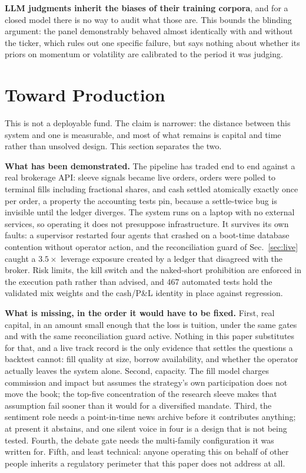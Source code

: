 \documentclass[10pt,twocolumn]{IEEEtran}
\begin{document}
\textbf{LLM judgments inherit the biases of their training corpora}, and for a
closed model there is no way to audit what those are. This bounds the blinding
argument: the panel demonstrably behaved almost identically with and without
the ticker, which rules out one specific failure, but says nothing about
whether its priors on momentum or volatility are calibrated to the period it
was judging.

\section{Toward Production}
\label{sec:production}

This is not a deployable fund. The claim is narrower: the distance between this
system and one is measurable, and most of what remains is capital and time
rather than unsolved design. This section separates the two.

\textbf{What has been demonstrated.} The pipeline has traded end to end against
a real brokerage API: sleeve signals became live orders, orders were polled to
terminal fills including fractional shares, and cash settled atomically exactly
once per order, a property the accounting tests pin, because a
settle-twice bug is invisible until the ledger diverges. The system runs on a
laptop with no external services, so operating it does not presuppose
infrastructure. It survives its own faults: a supervisor restarted four agents
that crashed on a boot-time database contention without operator action, and
the reconciliation guard of Sec.~\ref{sec:live} caught a $3.5\times$ leverage
exposure created by a ledger that disagreed with the broker. Risk limits, the
kill switch and the naked-short prohibition are enforced in the execution path
rather than advised, and 467 automated tests hold the validated mix weights and
the cash/P\&L identity in place against regression.

\textbf{What is missing, in the order it would have to be fixed.} First, real
capital, in an amount small enough that the loss is tuition, under the same
gates and with the same reconciliation guard active. Nothing in this paper
substitutes for that, and a live track record is the only evidence that settles
the questions a backtest cannot: fill quality at size, borrow availability,
and whether the operator actually leaves the system alone. Second, capacity.
The fill model charges commission and impact but assumes the strategy's own
participation does not move the book; the top-five concentration of the
research sleeve makes that assumption fail sooner than it would for a
diversified mandate. Third, the
sentiment role needs a point-in-time news archive before it contributes
anything; at present it abstains, and one silent voice in four is a design
that is not being tested. Fourth, the debate gate needs the multi-family
configuration it was written for. Fifth, and least technical: anyone operating
this on behalf of other people inherits a regulatory perimeter that this paper
does not address at all.
\end{document}
